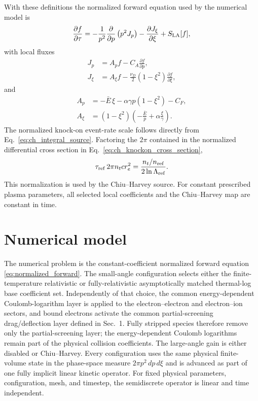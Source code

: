 \documentclass[11pt]{article}
\begin{document}
With these definitions the normalized forward equation used by the numerical model is
\begin{equation}
 \frac{\partial f}{\partial\tau}
 =-\frac{1}{p^2}\frac{\partial}{\partial p}\left(p^2J_p\right)
  -\frac{\partial J_\xi}{\partial\xi}
  +S_{\rm LA}[f],
 \label{eq:normalized_forward}
\end{equation}
with local fluxes
\begin{align}
 J_p
 &=A_p f-C_A\frac{\partial f}{\partial p},
 \label{eq:normalized_Jp}\\
 J_\xi
 &=A_\xi f
   -\frac{\nu_D}{2}(1-\xi^2)\frac{\partial f}{\partial\xi},
 \label{eq:normalized_Jxi}
\end{align}
and
\begin{align}
 A_p
 &=-\bar E\,\xi
   -\alpha\gamma p(1-\xi^2)
   -C_F,
 \label{eq:normalized_Ap}\\
 A_\xi
 &=(1-\xi^2)
   \left(-\frac{\bar E}{p}+\alpha\frac{\xi}{\gamma}\right).
 \label{eq:normalized_Axi}
\end{align}
The normalized knock-on event-rate scale follows directly from
Eq.~\eqref{eq:ch_integral_source}.  Factoring the $2\pi$ contained in the normalized
differential cross section in Eq.~\eqref{eq:ch_knockon_cross_section},
\begin{equation}
 \tau_{\rm ref}\,2\pi n_t c r_e^2
 =\frac{n_t/n_{\rm ref}}{2\ln\Lambda_{\rm ref}}.
 \label{eq:normalized_knockon_scale}
\end{equation}
This normalization is used by the Chiu--Harvey source.  For constant prescribed plasma
parameters, all selected local coefficients and the Chiu--Harvey map are constant in
time.

\section{Numerical model}

The numerical problem is the constant-coefficient normalized forward equation
\eqref{eq:normalized_forward}.  The small-angle configuration selects either the
finite-temperature relativistic or fully-relativistic asymptotically matched thermal-log
base coefficient set.  Independently of that choice, the common energy-dependent
Coulomb-logarithm layer is applied to the electron--electron and electron--ion sectors,
and bound electrons activate the common partial-screening drag/deflection layer defined
in Sec.~1.  Fully stripped species therefore remove only the partial-screening layer; the
energy-dependent Coulomb logarithms remain part of the physical collision coefficients.
The large-angle gain is either disabled or Chiu--Harvey.  Every configuration uses the same physical
finite-volume state in the phase-space measure $2\pi p^2\,dp\,d\xi$ and is advanced as
part of one fully implicit linear kinetic operator.  For fixed physical parameters,
configuration, mesh, and timestep, the semidiscrete operator is linear and time
independent.
\end{document}
